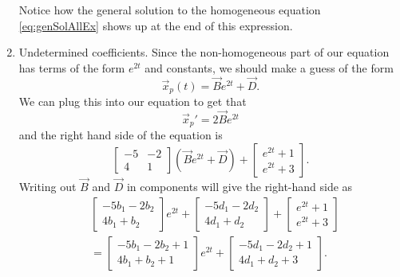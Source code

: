 \documentclass{ximera}
\begin{document}
\begin{exampleSol}
\begin{enumerate}
\begin{equation}
            \end{equation}
            Notice how the general solution to the homogeneous equation \eqref{eq:genSolAllEx} shows up at the end of this expression.
        \item Undetermined coefficients. Since the non-homogeneous part of our equation has terms of the form $e^{2t}$ and constants, we should make a guess of the form
            \begin{equation*}
                \vec{x}_p(t) = \vec{B}e^{2t} + \vec{D}.
            \end{equation*}
            We can plug this into our equation to get that 
            \begin{equation}\label{eq:AllSolUCRight}
                \vec{x}_p' = 2\vec{B}e^{2t}
            \end{equation}
            and the right hand side of the equation is 
            \begin{equation*}
                \begin{bmatrix} -5 & -2 \\ 4 & 1 \end{bmatrix}\left(\vec{B}e^{2t} + \vec{D}\right) + \begin{bmatrix} e^{2t} + 1 \\ e^{2t} + 3 \end{bmatrix}.
            \end{equation*}
            Writing out $\vec{B}$ and $\vec{D}$ in components will give the right-hand side as
            \begin{equation*}
                \begin{split}
                    & \begin{bmatrix} -5b_1 - 2b_2 \\ 4b_1 + b_2 \end{bmatrix}e^{2t} + \begin{bmatrix} -5d_1 - 2d_2 \\ 4d_1 + d_2 \end{bmatrix} + \begin{bmatrix} e^{2t} + 1 \\ e^{2t} + 3 \end{bmatrix} \\
                    &= \begin{bmatrix} -5b_1 - 2b_2 + 1 \\ 4b_1 + b_2 + 1 \end{bmatrix}e^{2t} + \begin{bmatrix} -5d_1 - 2d_2 + 1\\ 4d_1 + d_2 + 3 \end{bmatrix}.

\end{split}
\end{equation*}
\end{enumerate}
\end{exampleSol}
\end{document}
